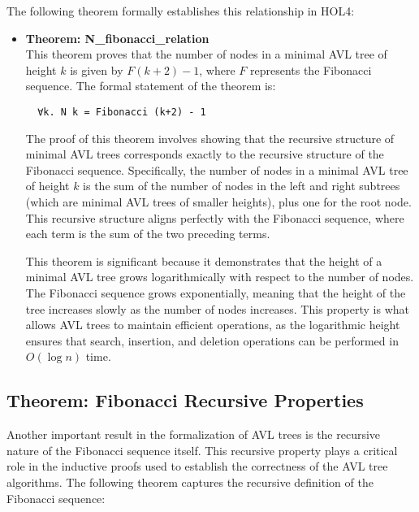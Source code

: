\documentclass[12pt]{article}
\begin{document}
The following theorem formally establishes this relationship in HOL4:

\begin{itemize}
  \item \textbf{Theorem: N\_fibonacci\_relation} \\
  This theorem proves that the number of nodes in a minimal AVL tree of height \( k \) is given by \( F(k+2) - 1 \), where \( F \) represents the Fibonacci sequence. The formal statement of the theorem is:
  \begin{verbatim}
  ∀k. N k = Fibonacci (k+2) - 1
  \end{verbatim}
  
  The proof of this theorem involves showing that the recursive structure of minimal AVL trees corresponds exactly to the recursive structure of the Fibonacci sequence. Specifically, the number of nodes in a minimal AVL tree of height \( k \) is the sum of the number of nodes in the left and right subtrees (which are minimal AVL trees of smaller heights), plus one for the root node. This recursive structure aligns perfectly with the Fibonacci sequence, where each term is the sum of the two preceding terms.

  This theorem is significant because it demonstrates that the height of a minimal AVL tree grows logarithmically with respect to the number of nodes. The Fibonacci sequence grows exponentially, meaning that the height of the tree increases slowly as the number of nodes increases. This property is what allows AVL trees to maintain efficient operations, as the logarithmic height ensures that search, insertion, and deletion operations can be performed in \( O(\log n) \) time.

\end{itemize}

\subsection{Theorem: Fibonacci Recursive Properties}

Another important result in the formalization of AVL trees is the recursive nature of the Fibonacci sequence itself. This recursive property plays a critical role in the inductive proofs used to establish the correctness of the AVL tree algorithms. The following theorem captures the recursive definition of the Fibonacci sequence:
\end{document}
